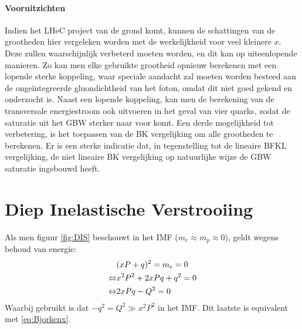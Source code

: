 \documentclass[a4paper,11pt]{article}
\numberwithin{equation}{section} %
\begin{document}
      \paragraph{Vooruitzichten}
Indien het LHeC project van de grond komt, kunnen de schattingen van de grootheden hier vergeleken worden met de werkelijkheid voor veel kleinere $x$.
Deze zullen waarschijnlijk verbeterd moeten worden, en dit kan op uiteenlopende manieren.
Zo kan men elke gebruikte grootheid opnieuw berekenen met een lopende sterke koppeling, waar speciale aandacht zal moeten worden besteed aan de ongeïntegreerde gluondichtheid van het foton, omdat dit niet goed gekend en onderzocht is.
Naast een lopende koppeling, kan men de berekening van de transversale energiestroom ook uitvoeren in het geval van vier quarks, zodat de saturatie uit het GBW sterker naar voor komt.
Een derde mogelijkheid tot verbetering, is het toepassen van de BK vergelijking om alle grootheden te berekenen.
Er is een sterke indicatie \cite{Kutak} dat, in tegenstelling tot de lineaire BFKL vergelijking, de niet lineaire BK vergelijking op natuurlijke wijze de GBW saturatie ingebouwd heeft.



\newpage
\appendix
\section{Diep Inelastische Verstrooiing} \label{app:DIS}
Als men figuur \ref{fig:DIS} beschouwt in het IMF ($m_e \approx m_p \approx 0$), geldt wegens behoud van energie:
\begin{align}
&(xP+q)^2 = m_e = 0 \notag \\
\Leftrightarrow &x^2 P^2 + 2xPq + q^2 = 0 \notag \\
\Leftrightarrow &2xPq -Q^2=0
\end{align}
Waarbij gebruikt is dat $-q^2 = Q^2 \gg x^2P^2$ in het  IMF. Dit laatste is equivalent met \eqref{eq:Bjorkenx}.
\end{document}
